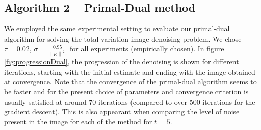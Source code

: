 \documentclass{paper}
\begin{document}
\subsection{Algorithm 2 -- Primal-Dual method}

We employed the same experimental setting to evaluate our primal-dual algorithm for solving the total variation image denoising problem. We chose \begin{math}\tau=0.02\end{math}, \begin{math}\sigma=\frac{0.95}{\left\|K\right\|^{2}\tau}\end{math} for all experiments (empirically chosen). In figure \ref{fig:progressionDual}, the progression of the denoising is shown for different iterations, starting with the initial estimate and ending with the image obtained at convergence. Note that the convergence of the primal-dual algorithm seems to be faster and for the present choice of parameters and convergence criterion is usually satisfied at around 70 iterations (compared to over 500 iterations for the gradient descent). This is also appearant when comparing the level of noise present in the image for each of the method for \begin{math}t=5\end{math}.
\end{document}
